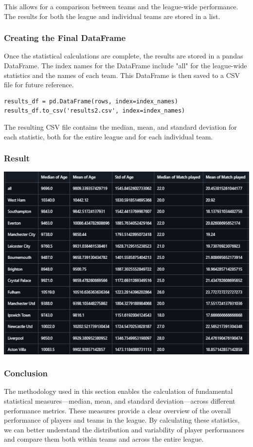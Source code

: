 \documentclass[a4paper,12pt]{article}
\begin{document}
This allows for a comparison between teams and the league-wide performance. The results for both the league and individual teams are stored in a list.

\subsubsection{Creating the Final DataFrame}

Once the statistical calculations are complete, the results are stored in a pandas DataFrame. The index names for the DataFrame include "all" for the league-wide statistics and the names of each team. This DataFrame is then saved to a CSV file for future reference.

\begin{verbatim}
results_df = pd.DataFrame(rows, index=index_names)
results_df.to_csv('results2.csv', index=index_names)
\end{verbatim}

The resulting CSV file contains the median, mean, and standard deviation for each statistic, both for the entire league and for each individual team.

\subsubsection{Result}
\includegraphics{results2.png}
\subsubsection{Conclusion}

The methodology used in this section enables the calculation of fundamental statistical measures—median, mean, and standard deviation—across different performance metrics. These measures provide a clear overview of the overall performance of players and teams in the league. By calculating these statistics, we can better understand the distribution and variability of player performances and compare them both within teams and across the entire league.
\end{document}
